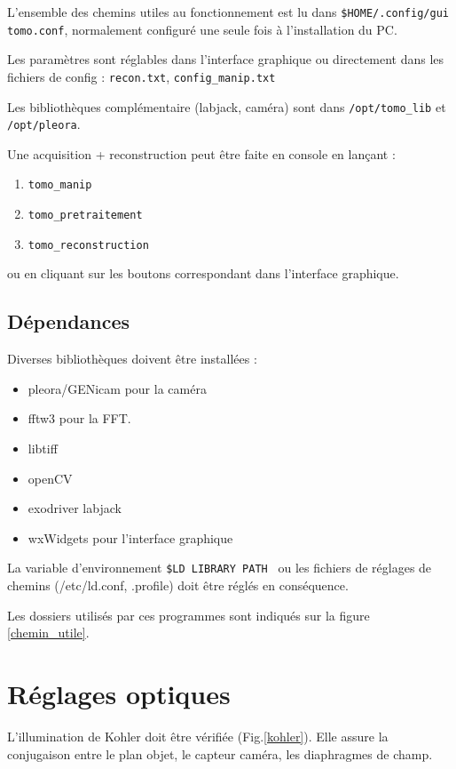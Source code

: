 \documentclass[	french,DIV=calc,%
							paper=a4,%
							fontsize=11pt,%
							twocolumn]{scrartcl}	 					%
\newcommand{\code}[1]{\texttt{#1}}
\begin{document}
L’ensemble des chemins utiles au fonctionnement est lu dans 
\code{\$HOME/.config/gui tomo.conf}, normalement configuré une seule fois à l'installation du PC.

Les paramètres sont réglables dans l'interface graphique ou directement dans les fichiers de config : \code{recon.txt}, \code{config\_manip.txt}

Les bibliothèques complémentaire (labjack, caméra) sont  dans 
\code{/opt/tomo\_lib} et \code{/opt/pleora}.





Une acquisition + reconstruction peut être faite en console en lançant :
\begin{enumerate}
	\item \code{tomo\_manip}
	\item  \code{tomo\_pretraitement}
	\item  \code{tomo\_reconstruction}
\end{enumerate}
ou en cliquant sur les boutons correspondant dans l'interface graphique.
\subsection{Dépendances}

Diverses bibliothèques doivent être installées :

\begin{itemize}
	\item pleora/GENicam pour la caméra
	\item fftw3 pour la FFT.
	\item libtiff
	\item openCV
	\item exodriver labjack 
	\item wxWidgets pour l'interface graphique
\end{itemize}
 La variable d’environnement \code{\$LD\ LIBRARY\ PATH } ou les fichiers de réglages de chemins  (/etc/ld.conf, .profile) doit être réglés en conséquence.

Les dossiers utilisés par ces programmes sont indiqués sur la figure \ref{chemin_utile}.
\section{Réglages optiques}

L'illumination de Kohler doit être vérifiée (Fig.\ref{kohler}). Elle assure la conjugaison entre le plan objet, le capteur caméra, les diaphragmes de champ.
\end{document}
